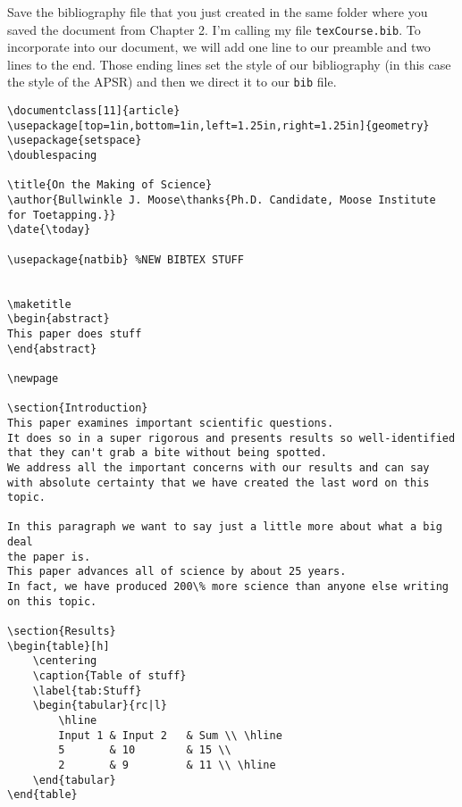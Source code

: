 Save the bibliography file that you just created in the same folder where you saved the document from Chapter 2. I'm calling my file \texttt{texCourse.bib}. To incorporate  into our document, we will add one line to our preamble and two lines to the end. Those ending lines set the style of our bibliography (in this case the style of the APSR) and then we direct it to our \texttt{bib} file.

\begin{lstlisting}
\documentclass[11]{article}
\usepackage[top=1in,bottom=1in,left=1.25in,right=1.25in]{geometry}
\usepackage{setspace}
\doublespacing

\title{On the Making of Science}
\author{Bullwinkle J. Moose\thanks{Ph.D. Candidate, Moose Institute for Toetapping.}}
\date{\today}

\usepackage{natbib} %NEW BIBTEX STUFF


\maketitle
\begin{abstract}
This paper does stuff
\end{abstract}

\newpage

\section{Introduction}
This paper examines important scientific questions.
It does so in a super rigorous and presents results so well-identified that they can't grab a bite without being spotted.
We address all the important concerns with our results and can say with absolute certainty that we have created the last word on this topic.

In this paragraph we want to say just a little more about what a big deal
the paper is.
This paper advances all of science by about 25 years.
In fact, we have produced 200\% more science than anyone else writing on this topic.

\section{Results}
\begin{table}[h]
	\centering
	\caption{Table of stuff}
	\label{tab:Stuff}
	\begin{tabular}{rc|l}
		\hline
		Input 1	& Input 2	& Sum \\ \hline
		5 		& 10 		& 15 \\
		2 		& 9 		& 11 \\ \hline
	\end{tabular}
\end{table}


\end{lstlisting}
